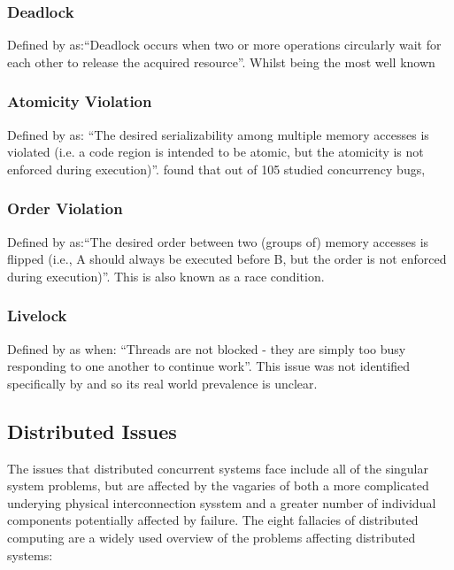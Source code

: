 \documentclass{sig-alternate}
\begin{document}
\subsubsection{Deadlock}
Defined by \cite{shanlu08:_learn_mistak_compr_study_real} as:``Deadlock occurs when two or more operations circularly wait for each other to release the acquired resource''. Whilst being the most well known 

\subsubsection{Atomicity Violation}
Defined by \cite{shanlu08:_learn_mistak_compr_study_real} as: ``The desired serializability among multiple memory accesses is violated (i.e. a code region is intended to be atomic, but the atomicity is not enforced during execution)''. \cite{shanlu08:_learn_mistak_compr_study_real} found that out of 105 studied concurrency bugs, 

\subsubsection{Order Violation}
Defined by \cite{shanlu08:_learn_mistak_compr_study_real} as:``The desired order between two (groups of) memory accesses is flipped (i.e., A should always be executed before B, but the order is not enforced during execution)''. This is also known as a race condition. 

\subsubsection{Livelock}
Defined by \cite{oracle:_starv_livel} as when: ``Threads are not blocked - they are simply too busy responding to one another to continue work''. This issue was not identified specifically by \cite{shanlu08:_learn_mistak_compr_study_real} and so its real world prevalence is unclear.

\subsection{Distributed Issues}
The issues that distributed concurrent systems face include all of the singular system problems, but are affected by the vagaries of both a more complicated underying physical interconnection sysstem and a greater number of individual components potentially affected by failure. The eight fallacies of distributed computing are a widely used overview of the problems affecting distributed systems:
\end{document}
